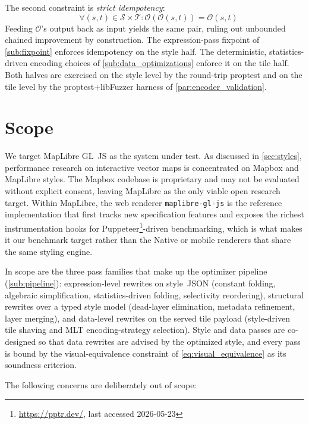 The second constraint is \emph{strict idempotency}:
\begin{equation}\label{eq:idempotency}
    \quad \forall (s, t) \in \mathcal{S} \times \mathcal{T}: \mathcal{O}(\mathcal{O}(s, t)) = \mathcal{O}(s, t)
\end{equation}
Feeding $\mathcal{O}$'s output back as input yields the same pair, ruling out unbounded chained improvement by construction.
The expression-pass fixpoint of \cref{sub:fixpoint} enforces idempotency on the style half.
The deterministic, statistics-driven encoding choices of \cref{sub:data_optimizations} enforce it on the tile half.
Both halves are exercised on the style level by the round-trip proptest and on the tile level by the proptest+libFuzzer harness of \cref{par:encoder_validation}.

\section{Scope}\label{sec:scope}

We target MapLibre GL~JS as the system under test.
As discussed in \cref{sec:styles}, performance research on interactive vector maps is concentrated on Mapbox and MapLibre styles.
The Mapbox codebase is proprietary and may not be evaluated without explicit consent, leaving MapLibre as the only viable open research target.
Within MapLibre, the web renderer \texttt{maplibre-gl-js} is the reference implementation that first tracks new specification features and exposes the richest instrumentation hooks for Puppeteer\footnote{\url{https://pptr.dev/}, last accessed 2026-05-23}-driven benchmarking, which is what makes it our benchmark target rather than the Native or mobile renderers that share the same styling engine.

In scope are the three pass families that make up the optimizer pipeline (\cref{sub:pipeline}): expression-level rewrites on style~\ac{JSON} (constant folding, algebraic simplification, statistics-driven folding, selectivity reordering), structural rewrites over a typed style model (dead-layer elimination, metadata refinement, layer merging), and data-level rewrites on the served tile payload (style-driven tile shaving and \ac{MLT} encoding-strategy selection).
Style and data passes are co-designed so that data rewrites are advised by the optimized style, and every pass is bound by the visual-equivalence constraint of \cref{eq:visual_equivalence} as its soundness criterion.

The following concerns are deliberately out of scope:


